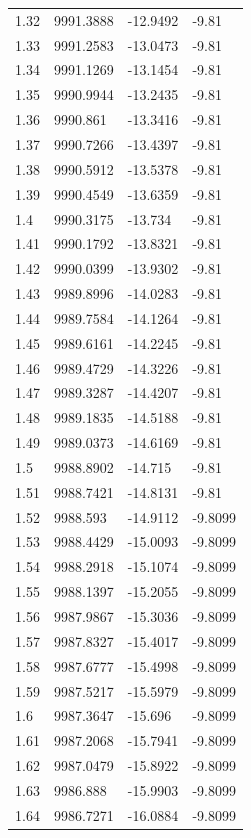 \begin{table}[H]
\begin{tabular}{llll}
1.32 & 9991.3888 & -12.9492 & -9.81 \\
1.33 & 9991.2583 & -13.0473 & -9.81 \\
1.34 & 9991.1269 & -13.1454 & -9.81 \\
1.35 & 9990.9944 & -13.2435 & -9.81 \\
1.36 & 9990.861 & -13.3416 & -9.81 \\
1.37 & 9990.7266 & -13.4397 & -9.81 \\
1.38 & 9990.5912 & -13.5378 & -9.81 \\
1.39 & 9990.4549 & -13.6359 & -9.81 \\
1.4 & 9990.3175 & -13.734 & -9.81 \\
1.41 & 9990.1792 & -13.8321 & -9.81 \\
1.42 & 9990.0399 & -13.9302 & -9.81 \\
1.43 & 9989.8996 & -14.0283 & -9.81 \\
1.44 & 9989.7584 & -14.1264 & -9.81 \\
1.45 & 9989.6161 & -14.2245 & -9.81 \\
1.46 & 9989.4729 & -14.3226 & -9.81 \\
1.47 & 9989.3287 & -14.4207 & -9.81 \\
1.48 & 9989.1835 & -14.5188 & -9.81 \\
1.49 & 9989.0373 & -14.6169 & -9.81 \\
1.5 & 9988.8902 & -14.715 & -9.81 \\
1.51 & 9988.7421 & -14.8131 & -9.81 \\
1.52 & 9988.593 & -14.9112 & -9.8099 \\
1.53 & 9988.4429 & -15.0093 & -9.8099 \\
1.54 & 9988.2918 & -15.1074 & -9.8099 \\
1.55 & 9988.1397 & -15.2055 & -9.8099 \\
1.56 & 9987.9867 & -15.3036 & -9.8099 \\
1.57 & 9987.8327 & -15.4017 & -9.8099 \\
1.58 & 9987.6777 & -15.4998 & -9.8099 \\
1.59 & 9987.5217 & -15.5979 & -9.8099 \\
1.6 & 9987.3647 & -15.696 & -9.8099 \\
1.61 & 9987.2068 & -15.7941 & -9.8099 \\
1.62 & 9987.0479 & -15.8922 & -9.8099 \\
1.63 & 9986.888 & -15.9903 & -9.8099 \\
1.64 & 9986.7271 & -16.0884 & -9.8099 \\

\end{tabular}
\end{table}
